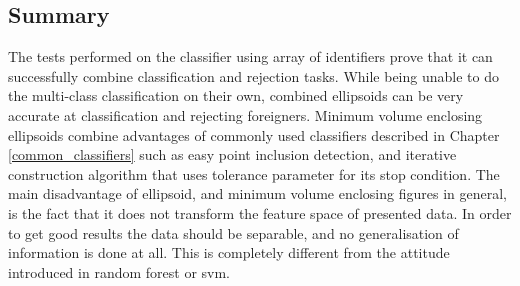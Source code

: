 \subsection{Summary}

The tests performed on the classifier using array of identifiers prove that it can successfully combine classification and rejection tasks. While being unable to do the multi-class classification on their own, combined ellipsoids can be very accurate at classification and rejecting foreigners. Minimum volume enclosing ellipsoids combine advantages of commonly used classifiers described in Chapter \ref{common_classifiers} such as easy point inclusion detection, and iterative construction algorithm that uses tolerance parameter for its stop condition. The main disadvantage of ellipsoid, and minimum volume enclosing figures in general, is the fact that it does not transform the feature space of presented data. In order to get good results the data should be separable, and no generalisation of information is done at all. This is completely different from the attitude introduced in random forest or svm.
